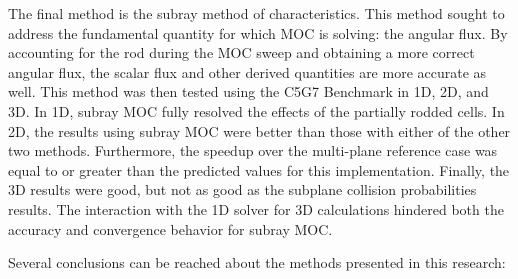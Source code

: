 The final method is the subray method of characteristics.  This method sought to address the fundamental quantity for which MOC is solving: the angular flux.  By accounting for the rod during the MOC sweep and obtaining a more correct angular flux, the scalar flux and other derived quantities are more accurate as well.  This method was then tested using the C5G7 Benchmark in 1D, 2D, and 3D.  In 1D, subray MOC fully resolved the effects of the partially rodded cells.  In 2D, the results using subray MOC were better than those with either of the other two methods.  Furthermore, the speedup over the multi-plane reference case was equal to or greater than the predicted values for this implementation.  Finally, the 3D results were good, but not as good as the subplane collision probabilities results.  The interaction with the 1D solver for 3D calculations hindered both the accuracy and convergence behavior for subray MOC.

Several conclusions can be reached about the methods presented in this research:

